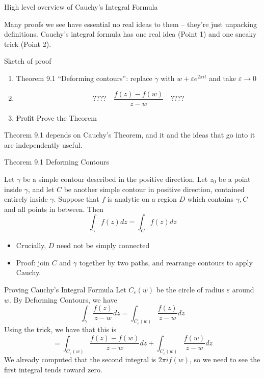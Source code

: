 \documentclass{beamer}
\begin{document}
\begin{frame}{High level overview of Cauchy's Integral Formula}

Many proofs we see have essential no real ideas to them -- they're just unpacking definitions.  Cauchy's integral formula has one real idea (Point 1) and one sneaky trick (Point 2).

    
\begin{block}{Sketch of proof}
\begin{enumerate}
    \item Theorem 9.1 ``Deforming contours'': replace $\gamma$ with $w+\varepsilon e^{2\pi i t}$ and take $\varepsilon\to 0$
    \item  $$????\quad\frac{f(z)-f(w)}{z-w}\quad????$$
    \item \sout{Profit} Prove the Theorem
\end{enumerate}
\end{block}
Theorem 9.1 depends on Cauchy's Theorem, and it and the ideas that go into it are independently useful.


\end{frame}
\begin{frame}{Theorem 9.1 Deforming Contours}
\begin{theorem} Let $\gamma$ be a simple contour described in the positive direction.  Let $z_0$ be a point inside $\gamma$, and let $C$ be another simple contour in positive direction, contained entirely inside $\gamma$. Suppose that $f$ is analytic on a region $D$ which contains $\gamma, C$ and all points in between.  Then
$$\int_\gamma f(z)dz=\int_C f(z)dz$$
\end{theorem}
\begin{itemize}
    \item Crucially, $D$ need not be simply connected
    \item Proof: join $C$ and $\gamma$ together by two paths, and rearrange contours to apply Cauchy.
\end{itemize}

\end{frame}

\begin{frame}{Proving Cauchy's Integral Formula}
Let $C_\varepsilon(w)$ be the circle of radius $\varepsilon$ around $w$.  
By Deforming Contours, we have
$$\int_\gamma \frac{f(z)}{z-w}dz=\int_{C_\varepsilon(w)} \frac{f(z)}{z-w}dz$$
Using the trick, we have that this is
$$=\int_{C_\varepsilon(w)}  \frac{f(z)-f(w)}{z-w}dz+\int_{C_\varepsilon(w)} \frac{f(w)}{z-w}dz$$
We already computed that the second integral is $2\pi i f(w)$, so we need to see the first integral tends toward zero.
\end{frame}
\end{document}
